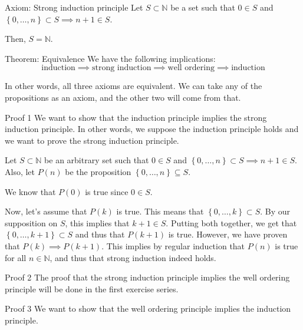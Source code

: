\documentclass[a4paper]{article}
\begin{document}
\begin{parag}{Axiom: Strong induction principle}
    Let $S \subset \mathbb{N}$ be a set such that $0 \in S$ and $\left\{0, \ldots, n\right\} \subset S \implies n + 1 \in S$.

    Then, $S = \mathbb{N}$.
\end{parag}

\begin{parag}{Theorem: Equivalence}
    We have the following implications: 
    \[\text{induction} \implies \text{strong induction} \implies \text{well ordering} \implies \text{induction}\]
    
    In other words, all three axioms are equivalent. We can take any of the propositions as an axiom, and the other two will come from that.

    \begin{subparag}{Proof 1}
        We want to show that the induction principle implies the strong induction principle. In other words, we suppose the induction principle holds and we want to prove the strong induction principle.

        Let $S \subset \mathbb{N}$ be an arbitrary set such that $0 \in S$ and $\left\{0, \ldots, n\right\} \subset S \implies n + 1 \in S$. Also, let $P\left(n\right)$ be the proposition $\left\{0, \ldots, n\right\} \subseteq S$. 

        We know that $P\left(0\right)$ is true since $0 \in S$.

        Now, let's assume that $P\left(k\right)$ is true. This means that $\left\{0, \ldots, k\right\} \subset S$. By our supposition on $S$, this implies that $k+1 \in S$. Putting both together, we get that $\left\{0, \ldots, k+1\right\} \subset S$ and thus that $P\left(k+1\right)$ is true. However, we have proven that $P\left(k\right) \implies P\left(k+1\right)$. This implies by regular induction that $P\left(n\right)$ is true for all $n \in \mathbb{N}$, and thus that strong induction indeed holds. 
    \end{subparag}
    
    \begin{subparag}{Proof 2}
        The proof that the strong induction principle implies the well ordering principle will be done in the first exercise series.
    \end{subparag}

    \begin{subparag}{Proof 3}
        We want to show that the well ordering principle implies the induction principle.


\end{subparag}
\end{parag}
\end{document}
